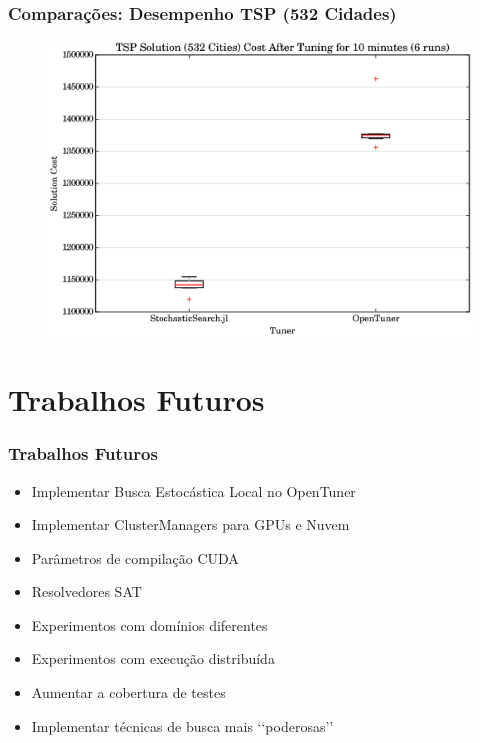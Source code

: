 \documentclass[10pt, compress]{beamer}
\begin{document}
\begin{frame}[fragile]
    \frametitle{Comparações: Desempenho TSP (532 Cidades)}
    \begin{figure}[H]
        \centering
        \includegraphics[width=1\textwidth]{att532_10min_comparison}
    \end{figure}%
\end{frame}

\section{Trabalhos Futuros}

\begin{frame}[fragile]
    \frametitle{Trabalhos Futuros}
    \begin{itemize}
        \item Implementar Busca Estocástica Local no \alert{OpenTuner}
        \item Implementar \alert{ClusterManagers} para \alert{GPUs} e \alert{Nuvem}
        \item Parâmetros de compilação \alert{CUDA}
        \item Resolvedores \alert{SAT}
        \item Experimentos com \alert{domínios diferentes}
        \item Experimentos com \alert{execução distribuída}
        \item \alert{Aumentar} a cobertura de testes
        \item Implementar técnicas de busca mais \lq{}\lq{}\alert{poderosas}\rq{}\rq{}
    \end{itemize}
\end{frame}
\end{document}
